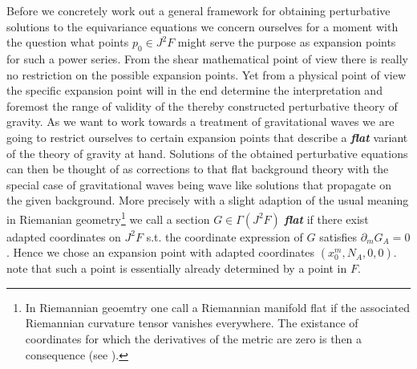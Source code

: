 \documentclass[a4paper,12pt, DIV=14, BCOR=5mm, twoside, headsepline]{scrbook}
\begin{document}
Before we concretely work out a general framework for obtaining perturbative solutions to the equivariance equations we concern ourselves for a moment with the question what points $p_0 \in J^2F$ might serve the purpose as expansion points for such a power series. From the shear mathematical point of view there is really no restriction on the possible expansion points. Yet from a physical point of view the specific expansion point will in the end determine the interpretation and foremost the range of validity of the thereby constructed perturbative theory of gravity. As we want to work towards a treatment of gravitational waves we are going to restrict ourselves to certain expansion points that describe a \textit{\textbf{flat}} variant of the theory of gravity at hand. Solutions of the obtained perturbative equations can then be thought of as corrections to that flat background theory with the special case of gravitational waves being wave like solutions that propagate on the given background. More precisely with a slight adaption of the usual meaning in Riemanian geometry\footnote{In Riemannian geoemtry one call a Riemannian manifold flat if the associated Riemannian curvature tensor vanishes everywhere. The existance of coordinates for which the derivatives of the metric are zero is then a consequence (see \cite{petersen2006riemannian}).} we call a section $G \in \Gamma(J^2F)$ \textit{\textbf{flat}} if there exist adapted coordinates on $J^2F$ s.t. the coordinate expression of $G$ satisfies $\partial_mG_{A}=0$.
Hence we chose an expansion point with adapted coordinates $(x_0^m,N_A,0,0)$. note that such a point is essentially already determined by a point in $F$. 
\end{document}
